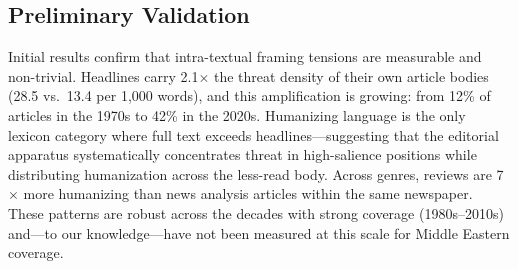 \documentclass{dhnbpub}
\begin{document}
\subsection{Preliminary Validation}

Initial results confirm that intra-textual framing tensions are measurable and non-trivial. Headlines carry 2.1$\times$ the threat density of their own article bodies (28.5 vs.\ 13.4 per 1,000 words), and this amplification is growing: from 12\% of articles in the 1970s to 42\% in the 2020s. Humanizing language is the only lexicon category where full text exceeds headlines---suggesting that the editorial apparatus systematically concentrates threat in high-salience positions while distributing humanization across the less-read body. Across genres, reviews are 7$\times$ more humanizing than news analysis articles within the same newspaper. These patterns are robust across the decades with strong coverage (1980s--2010s) and---to our knowledge---have not been measured at this scale for Middle Eastern coverage.

\clearpage
\printbibliography
\end{document}
